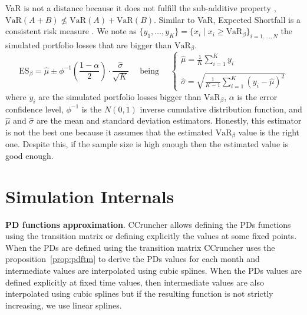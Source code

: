 \documentclass[11pt,fleqn]{book} %
\begin{document}
VaR is not a distance because it does not fulfill the sub-additive property 
\cite{var:varbad}, $\text{VaR}(A+B) \nleq \text{VaR}(A)+\text{VaR}(B)$. 
Similar to VaR, Expected Shortfall is a consistent risk measure 
\cite{var:eshortfall}. We note as
$\{y_1, \ldots, y_K\} = \{x_i \mid x_i \ge \text{VaR}_{\beta} \}_{i=1,\dots,N}$ 
the simulated portfolio losses that are bigger than $\text{VaR}_{\beta}$.
\begin{displaymath}
	\text{ES}_{\beta} = \widehat{\mu} \pm \phi^{-1}\left(\frac{1-\alpha}{2}\right) \cdot \frac{\widehat{\sigma}}{\sqrt{K}}
	\quad \text{ being } \quad
	\left\{
	\begin{array}{l}
		\displaystyle
		\widehat{\mu} = \frac{1}{K} \sum_{i=1}^{K} y_i \\
		\\
		\displaystyle
		\widehat{\sigma} =
		\sqrt{\frac{1}{K-1} \sum_{i=1}^{K} \left( y_i - \widehat{\mu} \right)^2}
	\end{array}
	\right.
\end{displaymath}
where $y_i$ are the simulated portfolio losses bigger than $\text{VaR}_{\beta}$, 
$\alpha$ is the error confidence level, $\phi^{-1}$ is the $N(0,1)$ 
inverse cumulative distribution function, and $\widehat{\mu}$ and 
$\widehat{\sigma}$ are the mean and standard deviation estimators.
Honestly, this estimator is not the best one because it assumes that
the estimated $\text{VaR}_{\beta}$ value is the right one. Despite this, 
if the sample size is high enough then the estimated value is good enough.

\section{Simulation Internals}

\textbf{PD functions approximation}. CCruncher allows defining the PDs
functions using the transition matrix or defining explicitly the values
at some fixed points. When the PDs are defined using the transition matrix 
CCruncher uses the proposition~\ref{prop:pdftm} to derive the PDs values 
for each month and intermediate values are interpolated using cubic splines. 
When the PDs values are defined explicitly at fixed time values, then 
intermediate values are also interpolated using cubic splines but if the 
resulting function is not strictly increasing, we use linear splines.
\end{document}
